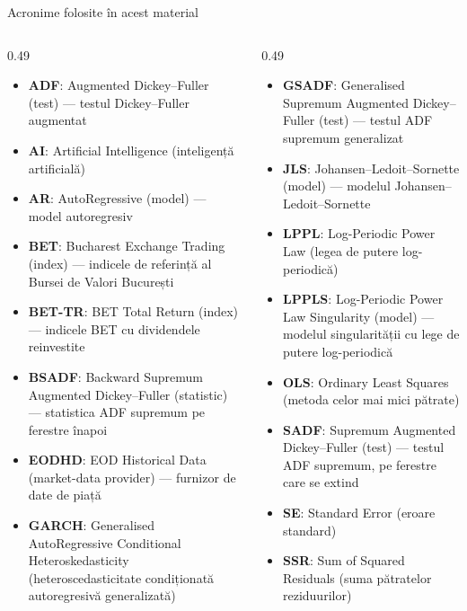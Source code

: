 {
\begin{frame}[noframenumbering]
    \titlepage
\end{frame}
}
\begin{frame}{Acronime folosite în acest material}
\begin{columns}[T]
\begin{column}{0.49\textwidth}
\begin{itemize}\setlength{\itemsep}{0pt}
    \item \textbf{ADF}: Augmented Dickey–Fuller (test) — testul Dickey–Fuller augmentat
    \item \textbf{AI}: Artificial Intelligence (inteligență artificială)
    \item \textbf{AR}: AutoRegressive (model) — model autoregresiv
    \item \textbf{BET}: Bucharest Exchange Trading (index) — indicele de referință al Bursei de Valori București
    \item \textbf{BET-TR}: BET Total Return (index) — indicele BET cu dividendele reinvestite
    \item \textbf{BSADF}: Backward Supremum Augmented Dickey–Fuller (statistic) — statistica ADF supremum pe ferestre înapoi
    \item \textbf{EODHD}: EOD Historical Data (market-data provider) — furnizor de date de piață
    \item \textbf{GARCH}: Generalised AutoRegressive Conditional Heteroskedasticity (heteroscedasticitate condiționată autoregresivă generalizată)
\end{itemize}
\end{column}
\begin{column}{0.49\textwidth}
\begin{itemize}\setlength{\itemsep}{0pt}
    \item \textbf{GSADF}: Generalised Supremum Augmented Dickey–Fuller (test) — testul ADF supremum generalizat
    \item \textbf{JLS}: Johansen–Ledoit–Sornette (model) — modelul Johansen–Ledoit–Sornette
    \item \textbf{LPPL}: Log-Periodic Power Law (legea de putere log-periodică)
    \item \textbf{LPPLS}: Log-Periodic Power Law Singularity (model) — modelul singularității cu lege de putere log-periodică
    \item \textbf{OLS}: Ordinary Least Squares (metoda celor mai mici pătrate)
    \item \textbf{SADF}: Supremum Augmented Dickey–Fuller (test) — testul ADF supremum, pe ferestre care se extind
    \item \textbf{SE}: Standard Error (eroare standard)
    \item \textbf{SSR}: Sum of Squared Residuals (suma pătratelor reziduurilor)
\end{itemize}
\end{column}
\end{columns}
\end{frame}

